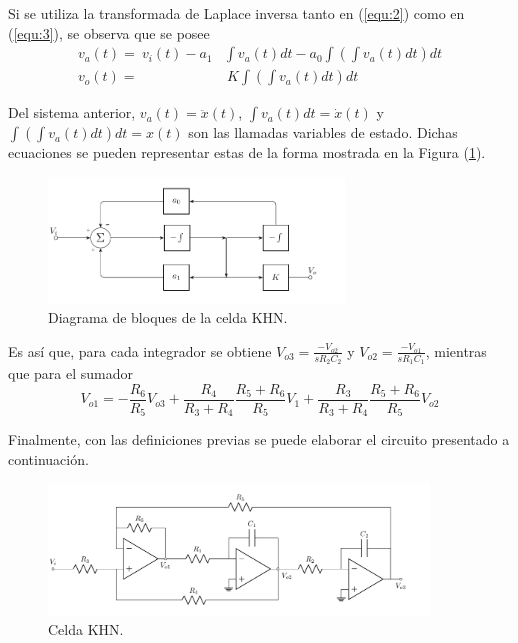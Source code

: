 Si se utiliza la transformada de Laplace inversa tanto en (\ref{equ:2}) como en (\ref{equ:3}), se observa que se posee
\begin{equation}
\begin{split}
	v_a(t) =\ v_i(t) - a_1 & \int v_a(t)dt - a_0 \int \left( \int v_a(t)dt \right) dt \\
	v_o(t) =& \ K\int \left( \int v_a(t)dt \right) dt
\end{split}
\end{equation}

Del sistema anterior, $v_a(t) = \ddot{x}(t) $, $\int v_a(t)dt = \dot{x}(t)$ y $\int \left( \int v_a(t)dt \right) dt = x(t)$ son las llamadas variables de estado. Dichas ecuaciones se pueden representar estas de la forma mostrada en la Figura (\ref{fig:blockKHN}).
\begin{figure}[H]
\centering
	\includegraphics[width=0.7\textwidth]{ImagenesEjercicio4/Bloques-KHN.pdf}
	\caption{Diagrama de bloques de la celda KHN.}
	\label{fig:blockKHN}
\end{figure}

Es así que, para cada integrador se obtiene $V_{o3} = \frac{-V_{o2}}{sR_2C_2}$ y
$V_{o2} = \frac{-V_{o1}}{sR_1C_1}$, mientras que para el sumador
\begin{equation*}
	V_{o1} = -\frac{R_6}{R_5} V_{o3} + \frac{R_4}{R_3 + R_4} \frac{R_5 + R_6}{R_5} V_1 + \frac{R_3}{R_3 + R_4} \frac{R_5 + R_6}{R_5} V_{o2}
\end{equation*}

Finalmente, con las definiciones previas se puede elaborar el circuito presentado a continuación.
\begin{figure}[H]
\centering
	\includegraphics[width=0.9\textwidth]{ImagenesEjercicio4/KHN.pdf}
	\caption{Celda KHN.}
	\label{fig:KHN}
\end{figure}

